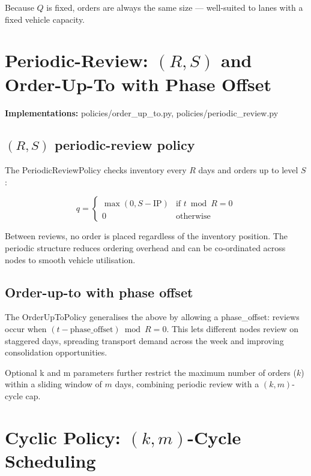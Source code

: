 Because $Q$ is fixed, orders are always the same size — well-suited to
lanes with a fixed vehicle capacity.

\section{Periodic-Review: $(R,S)$ and Order-Up-To with Phase Offset}
\label{sec:policies:rs}

\textbf{Implementations:} policies/order\_up\_to.py,
policies/periodic\_review.py

\subsection{$(R,S)$ periodic-review policy}

The PeriodicReviewPolicy checks inventory every $R$ days and
orders up to level $S$:

\begin{equation}
  q =
  \begin{cases}
    \max(0, S - \text{IP}) & \text{if } t \bmod R = 0 \\
    0                      & \text{otherwise}
  \end{cases}
\end{equation}

Between reviews, no order is placed regardless of the inventory position.
The periodic structure reduces ordering overhead and can be co-ordinated
across nodes to smooth vehicle utilisation.

\subsection{Order-up-to with phase offset}

The OrderUpToPolicy generalises the above by allowing a
phase\_offset: reviews occur when $(t - \text{phase\_offset}) \bmod R = 0$.
This lets different nodes review on staggered days, spreading transport
demand across the week and improving consolidation opportunities.

Optional k and m parameters further restrict the
maximum number of orders ($k$) within a sliding window of $m$ days,
combining periodic review with a $(k,m)$-cycle cap.

\section{Cyclic Policy: $(k,m)$-Cycle Scheduling}
\label{sec:policies:km}

